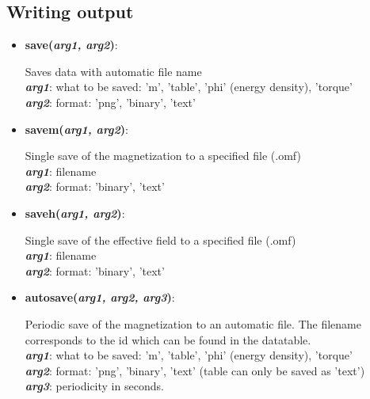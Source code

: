 \subsection{Writing output}

\begin{itemize}

 \item {\textbf{save(\textit{arg1, arg2})}:
				\flushright\parbox{0.9 \textwidth}{\vspace{-0.25cm} 
				Saves data with automatic file name\\
				\textbf{\textit{arg1}}: what to be saved: 'm', 'table', 'phi' (energy density), 'torque'\\
				\textbf{\textit{arg2}}: format: 'png', 'binary', 'text'
				}\flushleft}

 \item {\vspace{-0.4cm}\textbf{savem(\textit{arg1, arg2})}:
				\flushright\parbox{0.9 \textwidth}{\vspace{-0.25cm} 
				Single save of the magnetization to a specified file (.omf)\\
				\textbf{\textit{arg1}}: filename\\
				\textbf{\textit{arg2}}: format: 'binary', 'text'
				}\flushleft}

 \item {\vspace{-0.4cm}\textbf{saveh(\textit{arg1, arg2})}:
				\flushright\parbox{0.9 \textwidth}{\vspace{-0.25cm} 
				Single save of the effective field to a specified file (.omf)\\
				\textbf{\textit{arg1}}: filename\\
				\textbf{\textit{arg2}}: format: 'binary', 'text'
				}\flushleft}

 \item {\vspace{-0.4cm}\textbf{autosave(\textit{arg1, arg2, arg3})}:
				\flushright\parbox{0.9 \textwidth}{\vspace{-0.25cm} 
				Periodic save of the magnetization to an automatic file.  The filename corresponds to the id which can be found in the datatable.\\
				\textbf{\textit{arg1}}: what to be saved: 'm', 'table', 'phi' (energy density), 'torque'\\
				\textbf{\textit{arg2}}: format: 'png', 'binary', 'text' (table can only be saved as 'text')\\
				\textbf{\textit{arg3}}: periodicity in seconds.
				}\flushleft}


\end{itemize}
